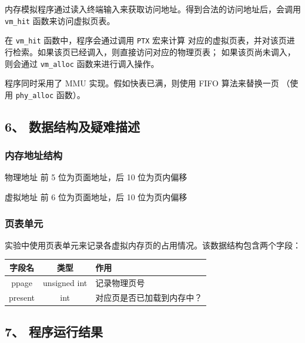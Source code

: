 \documentclass[12bp]{guo}
\begin{document}
内存模拟程序通过读入终端输入来获取访问地址。得到合法的访问地址后，会调用
\texttt{vm_hit} 函数来访问虚拟页表。


在 \texttt{vm_hit} 函数中，程序会通过调用 \texttt{PTX} 宏来计算
对应的虚拟页表，并对该页进行检索。如果该页已经调入，则直接访问对应的物理页表；
如果该页尚未调入，则会通过 \texttt{vm_alloc} 函数来进行调入操作。


程序同时采用了 MMU 实现。假如快表已满，则使用 FIFO 算法来替换一页
（使用 \texttt{phy_alloc} 函数）。


\subsection{6、 数据结构及疑难描述}

\subsubsection{内存地址结构}

\begin{description}
    \item{物理地址} 前 5 位为页面地址，后 10 位为页内偏移
    \item{虚拟地址} 前 6 位为页面地址，后 10 位为页内偏移
\end{description}

\subsubsection{页表单元}

实验中使用页表单元来记录各虚拟内存页的占用情况。该数据结构包含两个字段：

\begin{table}[H]
    \centering
    \begin{tabular}{| c | c | l |}
        \hline
        字段名 & 类型 & 作用 \\ \hline
        ppage & unsigned int & 记录物理页号 \\
        present & int & 对应页是否已加载到内存中？ \\ \hline
    \end{tabular}
\end{table}

\clearpage

\subsection{7、 程序运行结果}
\end{document}
